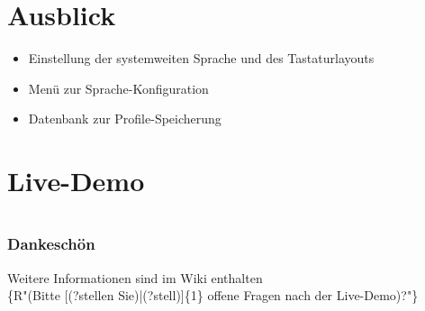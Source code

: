 \documentclass{beamer}
\begin{document}

\section{Ausblick}
\makeatletter
\newcommand{\setlistspacing}[2]{\def\@ld{#1}\expandafter\def\csname
@list\romannumeral\@ld \endcsname{\leftmargin\csname
leftmargin\romannumeral\@ld \endcsname
              \topsep    #2
              \parsep    0\p@   \@plus\p@
              \itemsep   #2}}
\makeatother
\begin{frame}
\Large
\begin{itemize}
	\item Einstellung der systemweiten Sprache und des Tastaturlayouts
	\item Menü zur Sprache-Konfiguration
	\item Datenbank zur Profile-Speicherung
\end{itemize}
	
\end{frame}

\normalsize

\section{Live-Demo}

\section*{ }
\begin{frame}
\frametitle{Dankeschön}
\centering
Weitere Informationen sind im Wiki enthalten\\

\{R"(Bitte [(?stellen Sie)|(?stell)]\{1\} offene Fragen nach der Live-Demo)?"\}

\end{frame}
\end{document}

